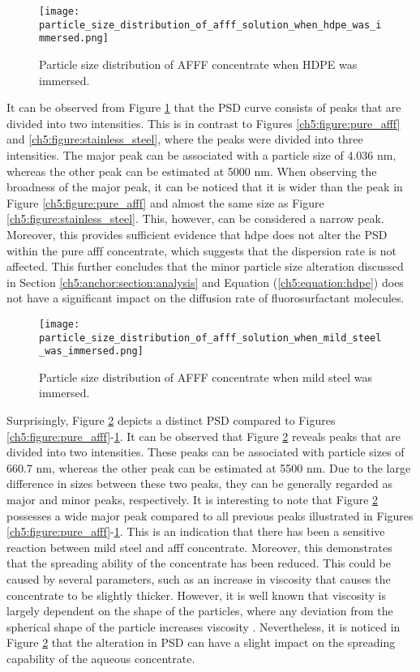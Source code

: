 \begin{figure}[H]
    \centering
    \texttt{[image: particle\_size\_distribution\_of\_afff\_solution\_when\_hdpe\_was\_immersed.png]}
    \caption{Particle size distribution of AFFF concentrate when HDPE was immersed.}
    \label{ch5:figure:hdpe}
\end{figure}

It can be observed from Figure \ref{ch5:figure:hdpe} that the PSD curve consists of peaks that are divided into two intensities. This is in contrast to Figures \ref{ch5:figure:pure_afff} and \ref{ch5:figure:stainless_steel}, where the peaks were divided into three intensities. The major peak can be associated with a particle size of 4.036 nm, whereas the other peak can be estimated at 5000 nm. When observing the broadness of the major peak, it can be noticed that it is wider than the peak in Figure \ref{ch5:figure:pure_afff} and almost the same size as Figure \ref{ch5:figure:stainless_steel}. This, however, can be considered a narrow peak. Moreover, this provides sufficient evidence that \acrshort{hdpe} does not alter the PSD within the pure \acrshort{afff} concentrate, which suggests that the dispersion rate is not affected. This further concludes that the minor particle size alteration discussed in Section \ref{ch5:anchor:section:analysis} and Equation (\ref{ch5:equation:hdpe}) does not have a significant impact on the diffusion rate of fluorosurfactant molecules.  
  
\begin{figure}[H]
    \centering
    \texttt{[image: particle\_size\_distribution\_of\_afff\_solution\_when\_mild\_steel\_was\_immersed.png]}
    \caption{Particle size distribution of AFFF concentrate when mild steel was immersed.}
    \label{ch5:figure:mild_steel}
\end{figure}

Surprisingly, Figure \ref{ch5:figure:mild_steel} depicts a distinct PSD compared to Figures \ref{ch5:figure:pure_afff}-\ref{ch5:figure:hdpe}. It can be observed that Figure \ref{ch5:figure:mild_steel} reveals peaks that are divided into two intensities. These peaks can be associated with particle sizes of 660.7 nm, whereas the other peak can be estimated at 5500 nm. Due to the large difference in sizes between these two peaks, they can be generally regarded as major and minor peaks, respectively. It is interesting to note that Figure \ref{ch5:figure:mild_steel} possesses a wide major peak compared to all previous peaks illustrated in Figures \ref{ch5:figure:pure_afff}-\ref{ch5:figure:hdpe}. This is an indication that there has been a sensitive reaction between mild steel and \acrshort{afff} concentrate. Moreover, this demonstrates that the spreading ability of the concentrate has been reduced. This could be caused by several parameters, such as an increase in viscosity that causes the concentrate to be slightly thicker. However, it is well known that viscosity is largely dependent on the shape of the particles, where any deviation from the spherical shape of the particle increases viscosity \cite{karau1997influence}. Nevertheless, it is noticed in Figure \ref{ch5:figure:mild_steel} that the alteration in PSD can have a slight impact on the spreading capability of the aqueous concentrate. 

